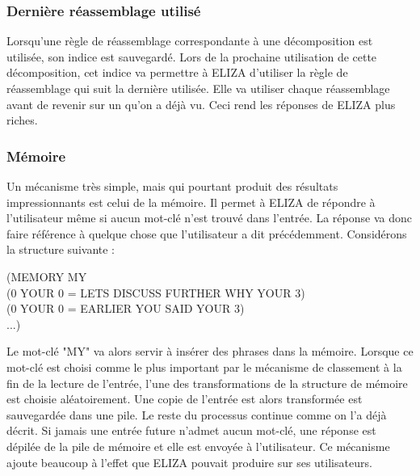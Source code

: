 \documentclass[11pt, a4paper]{report}
\begin{document}
  \subsubsection{Dernière réassemblage utilisé}
  Lorsqu'une règle de réassemblage correspondante à une décomposition 
  est utilisée, son indice est sauvegardé. 
  Lors de la prochaine utilisation de cette décomposition, cet indice 
  va permettre à ELIZA d'utiliser la règle de réassemblage qui suit la dernière utilisée. 
  Elle va utiliser chaque réassemblage avant de revenir sur un qu'on a déjà vu. 
  Ceci rend les réponses de ELIZA plus riches.
  
  \subsubsection{Mémoire}
  Un mécanisme très simple, mais qui pourtant produit des résultats impressionnants est celui 
  de la mémoire. Il permet à ELIZA de répondre à l'utilisateur même si aucun mot-clé n'est trouvé 
  dans l'entrée. La réponse va donc faire référence à quelque chose que l'utilisateur a dit 
  précédemment. Considérons la structure suivante : 

  \begin{center}
    (MEMORY MY \\
    (0 YOUR 0 = LETS DISCUSS FURTHER WHY YOUR 3) \\
    (0 YOUR 0 = EARLIER YOU SAID YOUR 3) \\
    ...)
  \end{center}

  Le mot-clé "MY" va alors servir à insérer des phrases dans la mémoire. Lorsque ce mot-clé 
  est choisi comme le plus important par le mécanisme de classement à la fin de la lecture 
  de l'entrée, l'une des transformations de la structure de mémoire est choisie aléatoirement. 
  Une copie de l'entrée est alors transformée est sauvegardée dans une pile. Le reste du processus 
  continue comme on l'a déjà décrit. Si jamais une entrée future n'admet aucun mot-clé, une réponse 
  est dépilée de la pile de mémoire et elle est envoyée à l'utilisateur. Ce mécanisme ajoute 
  beaucoup à l'effet que ELIZA pouvait produire sur ses utilisateurs. 
\end{document}
